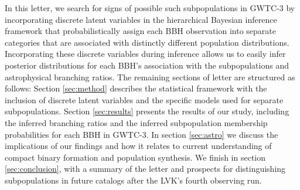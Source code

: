 In this letter, we search for signs of possible such subpopulations in GWTC-3 by incorporating discrete latent variables in the hierarchical Bayesian inference framework that probabilistically assign each BBH observation into separate categories that are associated with distinctly different population distributions. Incorporating these discrete variables during inference allows us to easily infer posterior distributions for each BBH's association with the subpopulations and astrophysical branching ratios. The remaining sections of letter are structured as follows: Section \ref{sec:method} describes the statistical framework with the inclusion of discrete latent variables and the specific models used for separate subpopulations. Section \ref{sec:results} presents the results of our study, including the inferred branching ratios and the inferred subpopulation membership probabilities for each BBH in GWTC-3. In section \ref{sec:astro} we discuss the implications of our findings and how it relates to current understanding of compact binary formation and population synthesis. We finish in section \ref{sec:conclusion}, with a summary of the letter and prospects for distinguishing subpopulations in future catalogs after the LVK's fourth observing run. 